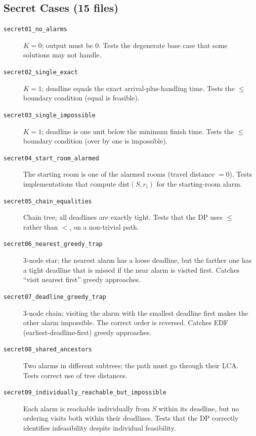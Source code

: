 \documentclass[11pt]{article}
\begin{document}
\subsection*{Secret Cases (15 files)}

\begin{description}
  \item[\texttt{secret01\_no\_alarms}]
        $K=0$; output must be $0$.
        Tests the degenerate base case that some solutions may not handle.

  \item[\texttt{secret02\_single\_exact}]
        $K=1$; deadline equals the exact arrival-plus-handling time.
        Tests the $\le$ boundary condition (equal is feasible).

  \item[\texttt{secret03\_single\_impossible}]
        $K=1$; deadline is one unit below the minimum finish time.
        Tests the $\le$ boundary condition (over by one is impossible).

  \item[\texttt{secret04\_start\_room\_alarmed}]
        The starting room is one of the alarmed rooms (travel distance $=0$).
        Tests implementations that compute $\mathrm{dist}(S,r_i)$ for the
        starting-room alarm.

  \item[\texttt{secret05\_chain\_equalities}]
        Chain tree; all deadlines are exactly tight.
        Tests that the DP uses $\le$ rather than $<$, on a non-trivial path.

  \item[\texttt{secret06\_nearest\_greedy\_trap}]
        3-node star; the nearest alarm has a loose deadline, but the farther
        one has a tight deadline that is missed if the near alarm is visited
        first.  Catches ``visit nearest first'' greedy approaches.

  \item[\texttt{secret07\_deadline\_greedy\_trap}]
        3-node chain; visiting the alarm with the smallest deadline first
        makes the other alarm impossible.  The correct order is reversed.
        Catches EDF (earliest-deadline-first) greedy approaches.

  \item[\texttt{secret08\_shared\_ancestors}]
        Two alarms in different subtrees; the path must go through their LCA.
        Tests correct use of tree distances.

  \item[\texttt{secret09\_individually\_reachable\_but\_impossible}]
        Each alarm is reachable individually from $S$ within its deadline, but
        no ordering visits both within their deadlines.
        Tests that the DP correctly identifies infeasibility despite individual
        feasibility.


\end{description}
\end{document}
